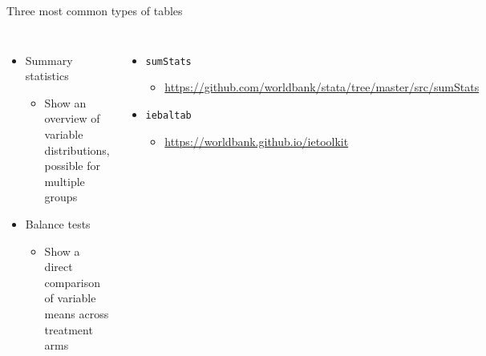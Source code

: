 \documentclass[aspectratio=169]{beamer}
\begin{document}
\begin{frame}[fragile]{Three most common types of tables}
	\begin{columns}[c]	
		\begin{itemize}
			\item Summary statistics
			\begin{itemize}
				\item Show an overview of variable distributions, possible for multiple groups
			\end{itemize}
			\item Balance tests
			\begin{itemize}
				\item Show a direct comparison of variable means across treatment arms
			\end{itemize}
		\end{itemize}
	
		\begin{itemize}
			\item \texttt{sumStats}
			\begin{itemize}
				\item \url{https://github.com/worldbank/stata/tree/master/src/sumStats}
			\end{itemize}
			\item \texttt{iebaltab}
			\begin{itemize}
				\item \url{https://worldbank.github.io/ietoolkit}
			\end{itemize}
		\end{itemize}
	\end{columns}
\end{frame}
\end{document}
